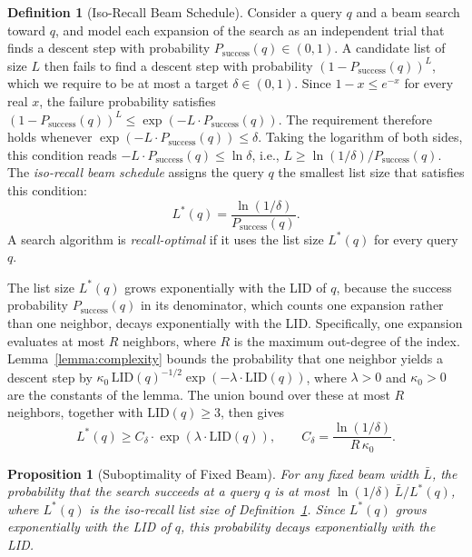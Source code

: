 \documentclass{article}
\theoremstyle{plain}
\newtheorem{proposition}[theorem]{Proposition}
\theoremstyle{definition}
\newtheorem{definition}[theorem]{Definition}
\theoremstyle{remark}
\begin{document}
\begin{definition}[Iso-Recall Beam Schedule]
\label{def:iso_recall}
Consider a query $q$ and a beam search toward $q$, and model each expansion of the search as an independent trial that finds a descent step with probability $P_{\mathrm{success}}(q) \in (0, 1)$. A candidate list of size $L$ then fails to find a descent step with probability $(1 - P_{\mathrm{success}}(q))^{L}$, which we require to be at most a target $\delta \in (0, 1)$. Since $1 - x \le e^{-x}$ for every real $x$, the failure probability satisfies $(1 - P_{\mathrm{success}}(q))^{L} \le \exp(-L \cdot P_{\mathrm{success}}(q))$. The requirement therefore holds whenever $\exp(-L \cdot P_{\mathrm{success}}(q)) \le \delta$. Taking the logarithm of both sides, this condition reads $-L \cdot P_{\mathrm{success}}(q) \le \ln \delta$, i.e., $L \ge \ln(1/\delta)/P_{\mathrm{success}}(q)$. The \emph{iso-recall beam schedule} assigns the query $q$ the smallest list size that satisfies this condition:
\begin{equation}
    L^*(q) = \frac{\ln(1/\delta)}{P_{\mathrm{success}}(q)}.
\end{equation}
A search algorithm is \emph{recall-optimal} if it uses the list size $L^*(q)$ for every query $q$.
\end{definition}

The list size $L^*(q)$ grows exponentially with the LID of $q$, because the success probability $P_{\mathrm{success}}(q)$ in its denominator, which counts one expansion rather than one neighbor, decays exponentially with the LID. Specifically, one expansion evaluates at most $R$ neighbors, where $R$ is the maximum out-degree of the index. Lemma~\ref{lemma:complexity} bounds the probability that one neighbor yields a descent step by $\kappa_0\, \mathrm{LID}(q)^{-1/2} \exp(-\lambda \cdot \mathrm{LID}(q))$, where $\lambda > 0$ and $\kappa_0 > 0$ are the constants of the lemma. The union bound over these at most $R$ neighbors, together with $\mathrm{LID}(q) \ge 3$, then gives
\begin{equation}
    L^*(q) \ge C_\delta \cdot \exp\!\left(\lambda \cdot \mathrm{LID}(q)\right), \qquad C_\delta = \frac{\ln(1/\delta)}{R\, \kappa_0}.
    \label{eq:oracle_schedule}
\end{equation}

\begin{proposition}[Suboptimality of Fixed Beam]
\label{prop:fixed_beam}
For any fixed beam width $\bar{L}$, the probability that the search succeeds at a query $q$ is at most $\ln(1/\delta)\, \bar{L}/L^*(q)$, where $L^*(q)$ is the iso-recall list size of Definition~\ref{def:iso_recall}. Since $L^*(q)$ grows exponentially with the LID of $q$, this probability decays exponentially with the LID.
\end{proposition}
\end{document}

